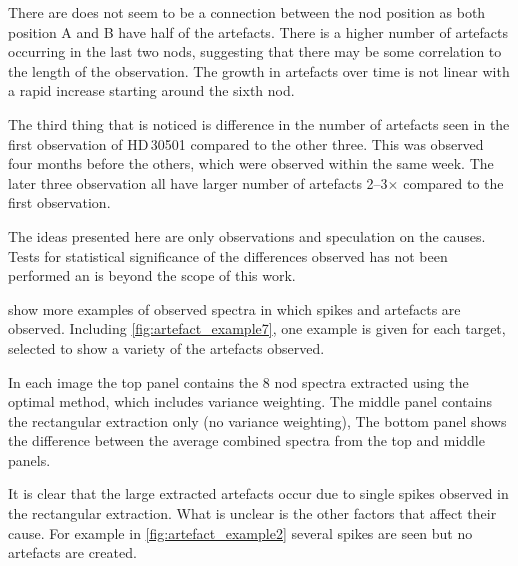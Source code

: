 There are does not seem to be a connection between the nod position as both position A and B have half of the artefacts.
There is a higher number of artefacts occurring in the last two nods, suggesting that there may be some correlation to the length of the observation.
The growth in artefacts over time is not linear with a rapid increase starting around the sixth nod.

The third thing that is noticed is difference in the number of artefacts seen in the first observation of HD\,30501 compared to the other three.
This was observed four months before the others, which were observed within the same week.
The later three observation all have larger number of artefacts 2--3$\times$ compared to the first observation.

The ideas presented here are only observations and speculation on the causes.
Tests for statistical significance of the differences observed has not been performed an is beyond the scope of this work.


 show more examples of observed spectra in which spikes and artefacts are observed. Including \cref{fig:artefact_example7}, one example is given for each target, selected to show a variety of the artefacts observed.

In each image the top panel contains the 8 nod spectra extracted using the optimal method, which includes variance weighting. The middle panel contains the rectangular extraction only (no variance weighting), The bottom panel shows the difference between the average combined spectra from the top and middle panels.

It is clear that the large extracted artefacts occur due to single spikes observed in the rectangular extraction.
What is unclear is the other factors that affect their cause.
For example in \cref{fig:artefact_example2} several spikes are seen but no artefacts are created.


